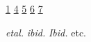 \soulregister\uline1
\soulregister\uline4
\soulregister\uline5
\soulregister\uline6
\soulregister\uline7  %

\soulregister{}
\soulregister{}
\soulregister{}
\soulregister{}
\soulregister{}  %


\renewcommand{\etal}{\textit{et\hairsp{}al.}\xspace}  %
\soulregister\etal
\newcommand{\ibid}{\textit{ibid.}\xspace}  %
\soulregister\ibid{}
\newcommand{\Ibid}{\textit{Ibid.}\xspace}  %
\soulregister\Ibid{}
\newcommand{\etc}{etc. \xspace}  %
\soulregister\etc{}
